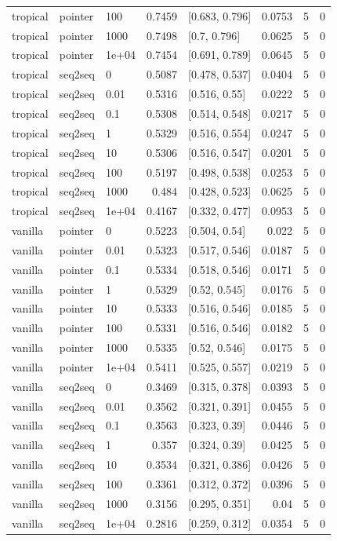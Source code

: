 \documentclass[10pt]{article}
\begin{document}
{\begin{longtable}{lllrlrrr}
tropical & pointer & 100 & 0.7459 & [0.683, 0.796] & 0.0753 & 5 & 0\\
tropical & pointer & 1000 & 0.7498 & [0.7, 0.796] & 0.0625 & 5 & 0\\
tropical & pointer & 1e+04 & 0.7454 & [0.691, 0.789] & 0.0645 & 5 & 0\\
tropical & seq2seq & 0 & 0.5087 & [0.478, 0.537] & 0.0404 & 5 & 0\\
tropical & seq2seq & 0.01 & 0.5316 & [0.516, 0.55] & 0.0222 & 5 & 0\\
tropical & seq2seq & 0.1 & 0.5308 & [0.514, 0.548] & 0.0217 & 5 & 0\\
tropical & seq2seq & 1 & 0.5329 & [0.516, 0.554] & 0.0247 & 5 & 0\\
tropical & seq2seq & 10 & 0.5306 & [0.516, 0.547] & 0.0201 & 5 & 0\\
tropical & seq2seq & 100 & 0.5197 & [0.498, 0.538] & 0.0253 & 5 & 0\\
tropical & seq2seq & 1000 & 0.484 & [0.428, 0.523] & 0.0625 & 5 & 0\\
tropical & seq2seq & 1e+04 & 0.4167 & [0.332, 0.477] & 0.0953 & 5 & 0\\
vanilla & pointer & 0 & 0.5223 & [0.504, 0.54] & 0.022 & 5 & 0\\
vanilla & pointer & 0.01 & 0.5323 & [0.517, 0.546] & 0.0187 & 5 & 0\\
vanilla & pointer & 0.1 & 0.5334 & [0.518, 0.546] & 0.0171 & 5 & 0\\
vanilla & pointer & 1 & 0.5329 & [0.52, 0.545] & 0.0176 & 5 & 0\\
vanilla & pointer & 10 & 0.5333 & [0.516, 0.546] & 0.0185 & 5 & 0\\
vanilla & pointer & 100 & 0.5331 & [0.516, 0.546] & 0.0182 & 5 & 0\\
vanilla & pointer & 1000 & 0.5335 & [0.52, 0.546] & 0.0175 & 5 & 0\\
vanilla & pointer & 1e+04 & 0.5411 & [0.525, 0.557] & 0.0219 & 5 & 0\\
vanilla & seq2seq & 0 & 0.3469 & [0.315, 0.378] & 0.0393 & 5 & 0\\
vanilla & seq2seq & 0.01 & 0.3562 & [0.321, 0.391] & 0.0455 & 5 & 0\\
vanilla & seq2seq & 0.1 & 0.3563 & [0.323, 0.39] & 0.0446 & 5 & 0\\
vanilla & seq2seq & 1 & 0.357 & [0.324, 0.39] & 0.0425 & 5 & 0\\
vanilla & seq2seq & 10 & 0.3534 & [0.321, 0.386] & 0.0426 & 5 & 0\\
vanilla & seq2seq & 100 & 0.3361 & [0.312, 0.372] & 0.0396 & 5 & 0\\
vanilla & seq2seq & 1000 & 0.3156 & [0.295, 0.351] & 0.04 & 5 & 0\\
vanilla & seq2seq & 1e+04 & 0.2816 & [0.259, 0.312] & 0.0354 & 5 & 0\\
\bottomrule
\end{longtable}
}
\end{document}
